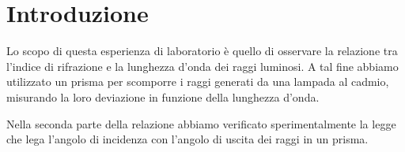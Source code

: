 \section{Introduzione}

Lo scopo di questa esperienza di laboratorio è quello di osservare la relazione tra l'indice di rifrazione e la lunghezza d'onda dei raggi luminosi. A tal fine abbiamo utilizzato un prisma per scomporre i raggi generati da una lampada al cadmio, misurando la loro deviazione in funzione della lunghezza d'onda.

Nella seconda parte della relazione abbiamo verificato sperimentalmente la legge che lega l'angolo di incidenza con l'angolo di uscita dei raggi in un prisma.

